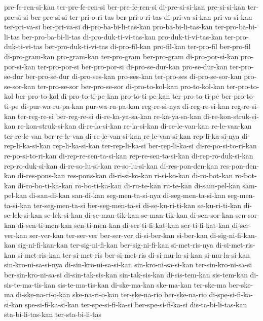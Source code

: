 {pre-fe-ren-si-kan ter-pre-fe-ren-si ber-pre-fe-ren-si di-pre-si-si-kan pre-si-si-kan ter-pre-si-si ber-pre-si-si ter-pri-o-ri-tas
ber-pri-o-ri-tas di-pri-va-si-kan pri-va-si-kan ter-pri-va-si ber-pri-va-si di-pro-ba-bi-li-tas-kan pro-ba-bi-li-tas-kan ter-pro-ba-bi-li-tas
ber-pro-ba-bi-li-tas di-pro-duk-ti-vi-tas-kan pro-duk-ti-vi-tas-kan ter-pro-duk-ti-vi-tas ber-pro-duk-ti-vi-tas di-pro-fil-kan pro-fil-kan ter-pro-fil
ber-pro-fil di-pro-gram-kan pro-gram-kan ter-pro-gram ber-pro-gram di-pro-por-si-kan pro-por-si-kan ter-pro-por-si
ber-pro-por-si di-pro-se-dur-kan pro-se-dur-kan ter-pro-se-dur ber-pro-se-dur di-pro-ses-kan pro-ses-kan ter-pro-ses
di-pro-se-sor-kan pro-se-sor-kan ter-pro-se-sor ber-pro-se-sor di-pro-to-kol-kan pro-to-kol-kan ter-pro-to-kol ber-pro-to-kol
di-pro-to-ti-pe-kan pro-to-ti-pe-kan ter-pro-to-ti-pe ber-pro-to-ti-pe di-pur-wa-ru-pa-kan pur-wa-ru-pa-kan reg-re-si-nya di-reg-re-si-kan
reg-re-si-kan ter-reg-re-si ber-reg-re-si di-re-ka-ya-sa-kan re-ka-ya-sa-kan di-re-kon-struk-si-kan re-kon-struk-si-kan di-re-la-si-kan
re-la-si-kan di-re-le-van-kan re-le-van-kan ter-re-le-van ber-re-le-van di-re-le-van-si-kan re-le-van-si-kan rep-li-ka-si-nya
di-rep-li-ka-si-kan rep-li-ka-si-kan ter-rep-li-ka-si ber-rep-li-ka-si di-re-po-si-to-ri-kan re-po-si-to-ri-kan di-rep-re-sen-ta-si-kan rep-re-sen-ta-si-kan
di-rep-ro-duk-si-kan rep-ro-duk-si-kan di-re-so-lu-si-kan re-so-lu-si-kan di-res-pon-den-kan res-pon-den-kan di-res-pons-kan res-pons-kan
di-ri-si-ko-kan ri-si-ko-kan di-ro-bot-kan ro-bot-kan di-ro-bo-ti-ka-kan ro-bo-ti-ka-kan di-ru-te-kan ru-te-kan
di-sam-pel-kan sam-pel-kan di-san-di-kan san-di-kan seg-men-ta-si-nya di-seg-men-ta-si-kan seg-men-ta-si-kan ter-seg-men-ta-si
ber-seg-men-ta-si di-se-ku-ri-ti-kan se-ku-ri-ti-kan di-se-lek-si-kan se-lek-si-kan di-se-man-tik-kan se-man-tik-kan di-sen-sor-kan
sen-sor-kan di-sen-ti-men-kan sen-ti-men-kan di-ser-ti-fi-kat-kan ser-ti-fi-kat-kan di-ser-ver-kan ser-ver-kan ter-ser-ver
ber-ser-ver di-si-ber-kan si-ber-kan di-sig-ni-fi-kan-kan sig-ni-fi-kan-kan ter-sig-ni-fi-kan ber-sig-ni-fi-kan si-met-ris-nya
di-si-met-ris-kan si-met-ris-kan ter-si-met-ris ber-si-met-ris di-si-mu-la-si-kan si-mu-la-si-kan sin-kro-ni-sa-si-nya di-sin-kro-ni-sa-si-kan
sin-kro-ni-sa-si-kan ter-sin-kro-ni-sa-si ber-sin-kro-ni-sa-si di-sin-tak-sis-kan sin-tak-sis-kan di-sis-tem-kan sis-tem-kan di-sis-te-ma-tis-kan
sis-te-ma-tis-kan di-ske-ma-kan ske-ma-kan ter-ske-ma ber-ske-ma di-ske-na-ri-o-kan ske-na-ri-o-kan ter-ske-na-rio
ber-ske-na-rio di-spe-si-fi-ka-si-kan spe-si-fi-ka-si-kan ter-spe-si-fi-ka-si ber-spe-si-fi-ka-si dis-ta-bi-li-tas-kan sta-bi-li-tas-kan ter-sta-bi-li-tas
}
